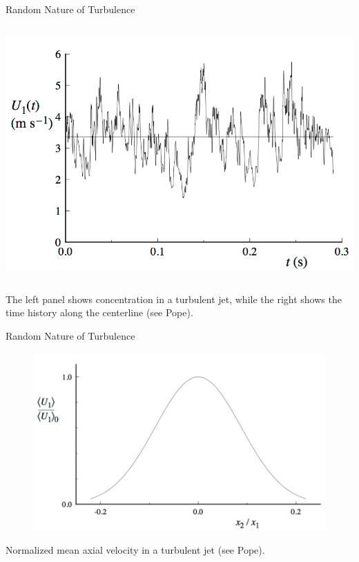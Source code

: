 \begin{frame}{Random Nature of Turbulence}
\begin{columns}[T]
\begin{column}{.65\textwidth}
\begin{minipage}[c][.7\textheight][c]{\linewidth}
    \includegraphics[width=\textwidth]{timetrace3.png}
    \end{minipage}
    \end{column}
  \end{columns}
  The left panel shows concentration in a turbulent jet, while the right shows the time history along the centerline (see Pope).
\end{frame}


\begin{frame}{Random Nature of Turbulence}
  \begin{figure}[H]
  \centering
  \includegraphics[width=1\textwidth]{crossu.png}
  \end{figure}
  Normalized mean axial velocity in a turbulent jet (see Pope).
\end{frame}


